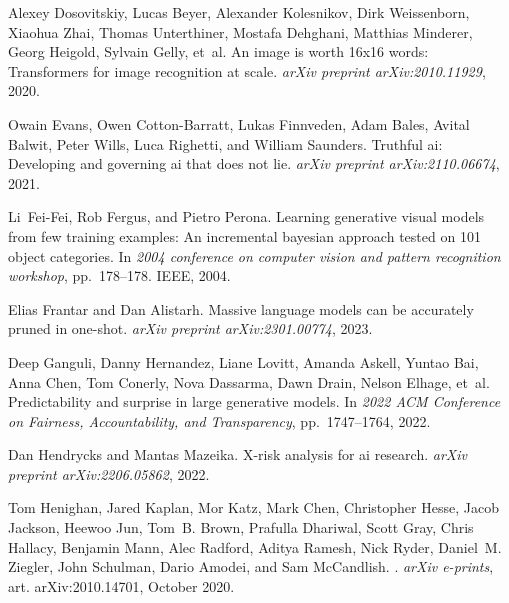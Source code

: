 \documentclass{article} %
\begin{document}
\begin{thebibliography}{67}
Alexey Dosovitskiy, Lucas Beyer, Alexander Kolesnikov, Dirk Weissenborn,
  Xiaohua Zhai, Thomas Unterthiner, Mostafa Dehghani, Matthias Minderer, Georg
  Heigold, Sylvain Gelly, et~al.
\newblock An image is worth 16x16 words: Transformers for image recognition at
  scale.
\newblock \emph{arXiv preprint arXiv:2010.11929}, 2020.

Owain Evans, Owen Cotton-Barratt, Lukas Finnveden, Adam Bales, Avital Balwit,
  Peter Wills, Luca Righetti, and William Saunders.
\newblock Truthful ai: Developing and governing ai that does not lie.
\newblock \emph{arXiv preprint arXiv:2110.06674}, 2021.

Li~Fei-Fei, Rob Fergus, and Pietro Perona.
\newblock Learning generative visual models from few training examples: An
  incremental bayesian approach tested on 101 object categories.
\newblock In \emph{2004 conference on computer vision and pattern recognition
  workshop}, pp.\  178--178. IEEE, 2004.

Elias Frantar and Dan Alistarh.
\newblock Massive language models can be accurately pruned in one-shot.
\newblock \emph{arXiv preprint arXiv:2301.00774}, 2023.

Deep Ganguli, Danny Hernandez, Liane Lovitt, Amanda Askell, Yuntao Bai, Anna
  Chen, Tom Conerly, Nova Dassarma, Dawn Drain, Nelson Elhage, et~al.
\newblock Predictability and surprise in large generative models.
\newblock In \emph{2022 ACM Conference on Fairness, Accountability, and
  Transparency}, pp.\  1747--1764, 2022.

Dan Hendrycks and Mantas Mazeika.
\newblock X-risk analysis for ai research.
\newblock \emph{arXiv preprint arXiv:2206.05862}, 2022.

Tom {Henighan}, Jared {Kaplan}, Mor {Katz}, Mark {Chen}, Christopher {Hesse},
  Jacob {Jackson}, Heewoo {Jun}, Tom~B. {Brown}, Prafulla {Dhariwal}, Scott
  {Gray}, Chris {Hallacy}, Benjamin {Mann}, Alec {Radford}, Aditya {Ramesh},
  Nick {Ryder}, Daniel~M. {Ziegler}, John {Schulman}, Dario {Amodei}, and Sam
  {McCandlish}.
.
\newblock \emph{arXiv e-prints}, art. arXiv:2010.14701, October 2020.


\end{thebibliography}
\end{document}
